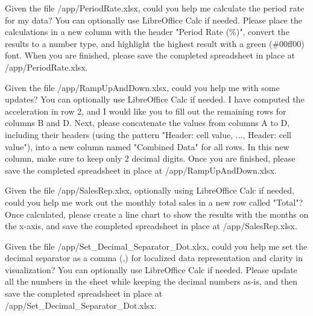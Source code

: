 \begin{instructionbox}
Given the file \textasciigrave{}/app/PeriodRate.xlsx\textasciigrave{}, could you help me calculate the period rate for my data? You can optionally use LibreOffice Calc if needed. Please place the calculations in a new column with the header "Period Rate (\%)", convert the results to a number type, and highlight the highest result with a green (\#00ff00) font. When you are finished, please save the completed spreadsheet in place at \textasciigrave{}/app/PeriodRate.xlsx\textasciigrave{}.
\end{instructionbox}

\begin{instructionbox}
Given the file \textasciigrave{}/app/RampUpAndDown.xlsx\textasciigrave{}, could you help me with some updates? You can optionally use LibreOffice Calc if needed. I have computed the acceleration in row 2, and I would like you to fill out the remaining rows for columns B and D. Next, please concatenate the values from columns A to D, including their headers (using the pattern "Header: cell value, ..., Header: cell value"), into a new column named "Combined Data" for all rows. In this new column, make sure to keep only 2 decimal digits. Once you are finished, please save the completed spreadsheet in place at \textasciigrave{}/app/RampUpAndDown.xlsx\textasciigrave{}.
\end{instructionbox}

\begin{instructionbox}
Given the file \textasciigrave{}/app/SalesRep.xlsx\textasciigrave{}, optionally using LibreOffice Calc if needed, could you help me work out the monthly total sales in a new row called "Total"? Once calculated, please create a line chart to show the results with the months on the x-axis, and save the completed spreadsheet in place at \textasciigrave{}/app/SalesRep.xlsx\textasciigrave{}.
\end{instructionbox}

\begin{instructionbox}
Given the file \textasciigrave{}/app/Set\_Decimal\_Separator\_Dot.xlsx\textasciigrave{}, could you help me set the decimal separator as a comma (,) for localized data representation and clarity in visualization? You can optionally use LibreOffice Calc if needed. Please update all the numbers in the sheet while keeping the decimal numbers as-is, and then save the completed spreadsheet in place at \textasciigrave{}/app/Set\_Decimal\_Separator\_Dot.xlsx\textasciigrave{}.
\end{instructionbox}

